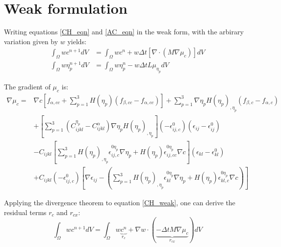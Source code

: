 \documentclass[11pt]{article}
\renewcommand{\=}[1]{\stackrel{#1}{=}} %
\theoremstyle{definition}
\theoremstyle{remark}
\begin{document}
\section{Weak formulation}
Writing equations \ref{CH_eqn} and \ref{AC_eqn} in the weak form, with the arbirary variation given by $w$ yields:
\begin{align}
\int_\Omega w c^{n+1} dV &= \int_\Omega wc^{n}+w  \Delta t [\nabla \cdot (M \nabla \mu_c) ] dV \label{CH_weak} \\
\int_\Omega w \eta_p^{n+1} dV &= \int_\Omega w \eta_p^{n}-w  \Delta t L \mu_{\eta_p} dV  \label{AC_weak}
\end{align}

The gradient of $\mu_c$ is:
\begin{equation}
\begin{split}
\nabla \mu_c = & \nabla c \left[f_{\alpha,cc}+ \sum_{p=1}^3 H(\eta_p)(f_{\beta,cc}-f_{\alpha,cc}) \right]+ \sum_{p=1}^3 \nabla \eta_p H(\eta_p)_{,\eta_p} (f_{\beta,c}-f_{\alpha,c}) \\
&+ \left[ \sum_{p=1}^3 (C_{ijkl}^{\eta_p} - C_{ijkl}^{\alpha} )\nabla \eta_p H(\eta_p)_{,\eta_p} \right](-\epsilon_{ij,c}^0)(\epsilon_{ij} - \epsilon_{ij}^0) \\
&- C_{ijkl} \left[  \sum_{p=1}^3 H(\eta_p)_{,\eta_p} \epsilon_{ij,c}^{0\eta_p} \nabla \eta_p + H(\eta_p) \epsilon_{ij,cc}^{0\eta_p} \nabla c \right](\epsilon_{kl}-\epsilon_{kl}^0)\\
&+ C_{ijkl} (-\epsilon_{ij,c}^0) \left[ \nabla \epsilon_{ij} -  \left( \sum_{p=1}^3 H(\eta_p)_{,\eta_p} \epsilon_{kl}^{0\eta_p} \nabla \eta_p + H(\eta_p) \epsilon_{kl,c}^{0\eta_p} \nabla c \right) \right]
\end{split}
\end{equation}

Applying the divergence theorem to equation \ref{CH_weak}, one can derive the residual terms $r_c$ and $r_{cx}$:
\begin{equation}
\int_\Omega w c^{n+1} dV = \int_\Omega w\underbrace{c^{n}}_{r_c}+\nabla w \cdot (\underbrace{-\Delta t  M \nabla \mu_c}_{r_{cx}} ) dV
\end{equation}
\end{document}
